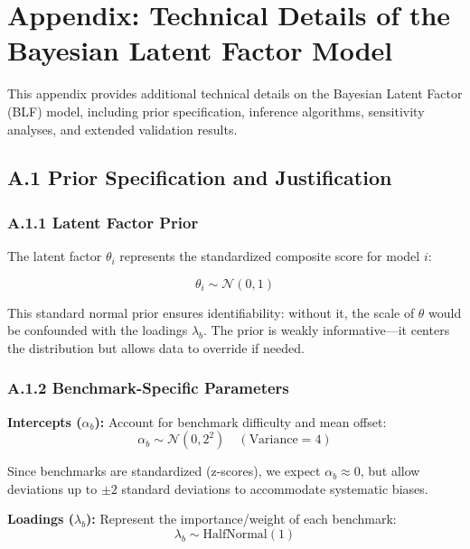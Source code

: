 \section*{Appendix: Technical Details of the Bayesian Latent Factor Model}
\label{appendix:blf}

This appendix provides additional technical details on the Bayesian Latent Factor (BLF) model, including prior specification, inference algorithms, sensitivity analyses, and extended validation results.

\subsection*{A.1 Prior Specification and Justification}

\subsubsection*{A.1.1 Latent Factor Prior}

The latent factor $\theta_i$ represents the standardized composite score for model $i$:

\begin{equation}
\theta_i \sim \mathcal{N}(0, 1)
\end{equation}

This standard normal prior ensures identifiability: without it, the scale of $\theta$ would be confounded with the loadings $\lambda_b$. The prior is weakly informative---it centers the distribution but allows data to override if needed.

\subsubsection*{A.1.2 Benchmark-Specific Parameters}

\textbf{Intercepts ($\alpha_b$):} Account for benchmark difficulty and mean offset:
\begin{equation}
\alpha_b \sim \mathcal{N}(0, 2^2) \quad (\text{Variance} = 4)
\end{equation}

Since benchmarks are standardized (z-scores), we expect $\alpha_b \approx 0$, but allow deviations up to $\pm 2$ standard deviations to accommodate systematic biases.

\textbf{Loadings ($\lambda_b$):} Represent the importance/weight of each benchmark:
\begin{equation}
\lambda_b \sim \text{HalfNormal}(1)
\end{equation}

